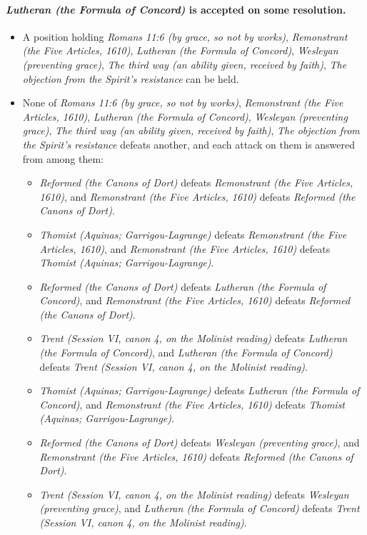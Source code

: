 \documentclass[11pt]{article}
\begin{document}
\paragraph{\emph{Lutheran (the Formula of Concord)} is accepted on some resolution.}
\begin{itemize}
\item A position holding \emph{Romans 11:6 (by grace, so not by works)}, \emph{Remonstrant (the Five Articles, 1610)}, \emph{Lutheran (the Formula of Concord)}, \emph{Wesleyan (preventing grace)}, \emph{The third way (an ability given, received by faith)}, \emph{The objection from the Spirit’s resistance} can be held.
\item None of \emph{Romans 11:6 (by grace, so not by works)}, \emph{Remonstrant (the Five Articles, 1610)}, \emph{Lutheran (the Formula of Concord)}, \emph{Wesleyan (preventing grace)}, \emph{The third way (an ability given, received by faith)}, \emph{The objection from the Spirit’s resistance} defeats another, and each attack on them is answered from among them:
\begin{itemize}
\item \emph{Reformed (the Canons of Dort)} defeats \emph{Remonstrant (the Five Articles, 1610)}, and \emph{Remonstrant (the Five Articles, 1610)} defeats \emph{Reformed (the Canons of Dort)}.
\item \emph{Thomist (Aquinas; Garrigou-Lagrange)} defeats \emph{Remonstrant (the Five Articles, 1610)}, and \emph{Remonstrant (the Five Articles, 1610)} defeats \emph{Thomist (Aquinas; Garrigou-Lagrange)}.
\item \emph{Reformed (the Canons of Dort)} defeats \emph{Lutheran (the Formula of Concord)}, and \emph{Remonstrant (the Five Articles, 1610)} defeats \emph{Reformed (the Canons of Dort)}.
\item \emph{Trent (Session VI, canon 4, on the Molinist reading)} defeats \emph{Lutheran (the Formula of Concord)}, and \emph{Lutheran (the Formula of Concord)} defeats \emph{Trent (Session VI, canon 4, on the Molinist reading)}.
\item \emph{Thomist (Aquinas; Garrigou-Lagrange)} defeats \emph{Lutheran (the Formula of Concord)}, and \emph{Remonstrant (the Five Articles, 1610)} defeats \emph{Thomist (Aquinas; Garrigou-Lagrange)}.
\item \emph{Reformed (the Canons of Dort)} defeats \emph{Wesleyan (preventing grace)}, and \emph{Remonstrant (the Five Articles, 1610)} defeats \emph{Reformed (the Canons of Dort)}.
\item \emph{Trent (Session VI, canon 4, on the Molinist reading)} defeats \emph{Wesleyan (preventing grace)}, and \emph{Lutheran (the Formula of Concord)} defeats \emph{Trent (Session VI, canon 4, on the Molinist reading)}.

\end{itemize}
\end{itemize}
\end{document}
